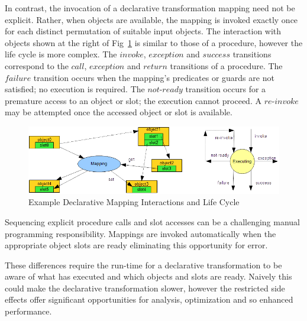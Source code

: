 \documentclass{llncs}
\begin{document}
In contrast, the invocation of a declarative transformation mapping need not be explicit. Rather, when objects are available, the mapping is invoked exactly once for each distinct permutation of suitable input objects. The interaction with objects shown at the right of Fig~\ref{fig:MappingContext} is similar to those of a procedure, however the life cycle is more complex. The $invoke$, $exception$ and $success$ transitions correspond to the $call$, $exception$ and $return$ transitions of a procedure. The $failure$ transition occurs when the mapping's predicates or guards are not satisfied; no execution is required. The $not$-$ready$ transition occurs for a premature access to an object or slot; the execution cannot proceed. A $re$-$invoke$ may be attempted once the accessed object or slot is available.

\begin{figure}
	\begin{center}
		\includegraphics[width=4.5in]{MappingContext.png}
	\end{center}
	\caption{Example Declarative Mapping Interactions and Life Cycle}
	\label{fig:MappingContext}
\end{figure}




Sequencing explicit procedure calls and slot accesses can be a challenging manual programming responsibility. Mappings are invoked automatically when the appropriate object slots are ready eliminating this opportunity for error.

These differences require the run-time for a declarative transformation to be aware of what has executed and which objects and slots are ready. Naively this could make the declarative transformation slower, however the restricted side effects offer significant opportunities for analysis, optimization and so enhanced performance.
\end{document}
